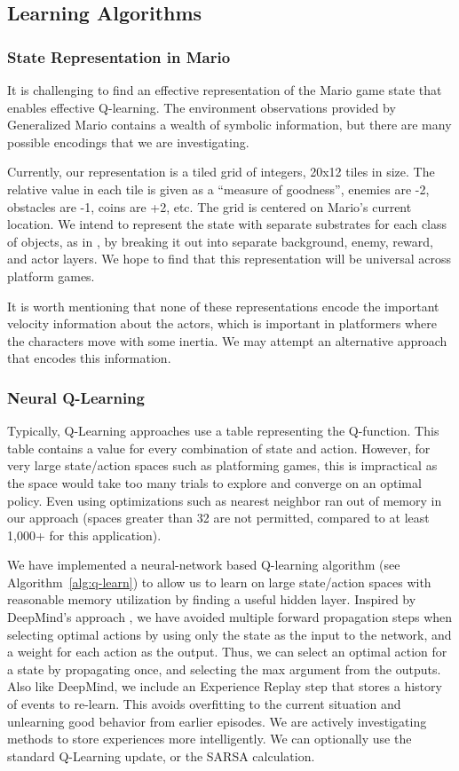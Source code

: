 \documentclass{article}
\begin{document}
\subsection{Learning Algorithms}

\subsubsection{State Representation in Mario}
It is challenging to find an effective representation of the Mario game state that enables effective Q-learning. The environment observations provided by Generalized Mario contains a wealth of symbolic information, but there are many possible encodings that we are investigating.

Currently, our representation is a tiled grid of integers, 20x12 tiles in size. The relative value in each tile is given as a ``measure of goodness'', enemies are -2, obstacles are -1, coins are +2, etc. The grid is centered on Mario's current location. We intend to represent the state with separate substrates for each class of objects, as in \cite{Hauskneck13}, by breaking it out into separate background, enemy, reward, and actor layers. We hope to find that this representation will be universal across platform games. 

It is worth mentioning that none of these representations encode the important velocity information about the actors, which is important in platformers where the characters move with some inertia. We may attempt an alternative approach that encodes this information.

\subsubsection{Neural Q-Learning}

Typically, Q-Learning approaches use a table representing the Q-function. This table contains a value for every combination of state and action. However, for very large state/action spaces such as platforming games, this is impractical as the space would take too many trials to explore and converge on an optimal policy. Even using optimizations such as nearest neighbor ran out of memory in our approach (spaces greater than 32 are not permitted, compared to at least 1,000+ for this application). 

We have implemented a neural-network based Q-learning algorithm (see Algorithm~\ref{alg:q-learn}) to allow us to learn on large state/action spaces with reasonable memory utilization by finding a useful hidden layer. Inspired by DeepMind's approach \cite{Mnih13}, we have avoided multiple forward propagation steps when selecting optimal actions by using only the state as the input to the network, and a weight for each action as the output. Thus, we can select an optimal action for a state by propagating once, and selecting the max argument from the outputs. Also like DeepMind, we include an Experience Replay step that stores a history of events to re-learn. This avoids overfitting to the current situation and unlearning good behavior from earlier episodes. We are actively investigating methods to store experiences more intelligently. We can optionally use the standard Q-Learning update, or the SARSA calculation.
\end{document}
